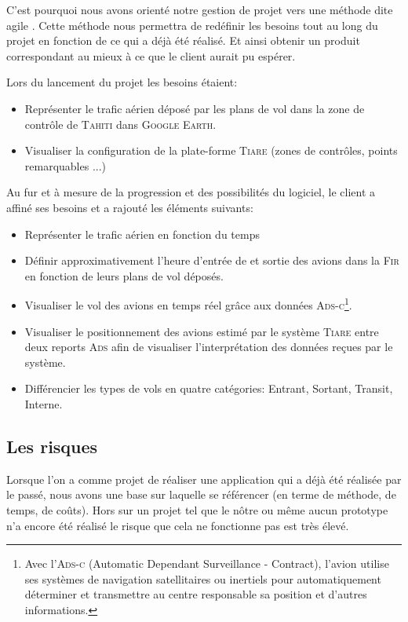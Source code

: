 C'est pourquoi nous avons orienté notre gestion de projet vers une méthode dite agile . Cette méthode nous permettra de redéfinir les besoins tout au long du projet en fonction de ce qui a déjà été réalisé. Et ainsi obtenir un produit correspondant au mieux à ce que le client aurait pu espérer.

Lors du lancement du projet les besoins étaient:
\begin{itemize}
    \item Représenter le trafic aérien déposé par les plans de vol dans la zone de contrôle de \textsc{Tahiti} dans \textsc{Google Earth}.
    \item Visualiser la configuration de la plate-forme \textsc{Tiare} (zones de contrôles, points remarquables ...)
\end{itemize}\medskip

Au fur et à mesure de la progression et des possibilités du logiciel, le client a affiné ses besoins et a rajouté les éléments suivants:
\begin{itemize}
    \item Représenter le trafic aérien en fonction du temps
    \item Définir approximativement l'heure d'entrée de et sortie des avions dans la \textsc{Fir}  en fonction de leurs plans de vol déposés.
    \item Visualiser le vol des avions en temps réel grâce aux données \textsc{Ads-c}\footnote{Avec l'\textsc{Ads-c} (Automatic Dependant Surveillance - Contract), l'avion utilise ses systèmes de navigation satellitaires ou inertiels pour automatiquement déterminer et transmettre au centre responsable sa position et d'autres informations.}.
    \item Visualiser le positionnement des avions estimé par le système \textsc{Tiare} entre deux reports \textsc{Ads} afin de visualiser l'interprétation des données reçues par le système.
    \item Différencier les types de vols en quatre catégories: Entrant, Sortant, Transit, Interne. 
\end{itemize}\medskip

    \subsection{Les risques}
Lorsque l'on a comme projet de réaliser une application qui a déjà été réalisée par le passé, nous avons une base sur laquelle se référencer (en terme de méthode, de temps, de coûts). Hors sur un projet tel que le nôtre ou même aucun prototype n'a encore été réalisé le risque que cela ne fonctionne pas est très élevé.

